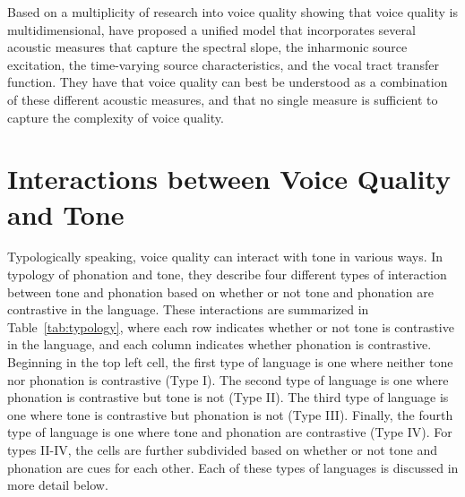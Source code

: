 Based on a multiplicity of research into voice quality showing that voice quality is multidimensional, \citet{kreimanUnifiedTheoryVoice2014,kreimanValidatingPsychoacousticModel2021} have proposed a unified model that incorporates several acoustic measures that capture the spectral slope, the inharmonic source excitation, the time-varying source characteristics, and the vocal tract transfer function. They have that voice quality can best be understood as a combination of these different acoustic measures, and that no single measure is sufficient to capture the complexity of voice quality.

\section{Interactions between Voice Quality and Tone} \label{sec:interactions_between_voice_quality_and_tone}

Typologically speaking, voice quality can interact with tone in various ways. In  typology of phonation and tone, they describe four different types of interaction between tone and phonation based on whether or not tone and phonation are contrastive in the language. These interactions are summarized in Table~\ref{tab:typology}, where each row indicates whether or not tone is contrastive in the language, and each column indicates whether phonation is contrastive. Beginning in the top left cell, the first type of language is one where neither tone nor phonation is contrastive (Type I). The second type of language is one where phonation is contrastive but tone is not (Type II). The third type of language is one where tone is contrastive but phonation is not (Type III). Finally, the fourth type of language is one where tone and phonation are contrastive (Type IV). For types II-IV, the cells are further subdivided based on whether or not tone and phonation are cues for each other. Each of these types of languages is discussed in more detail below.


